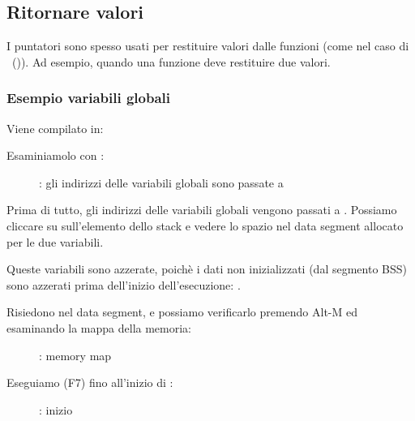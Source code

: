 \subsection{Ritornare valori}

I puntatori sono spesso usati per restituire valori dalle funzioni (come nel caso di \scanf ~()).
Ad esempio, quando una funzione deve restituire due valori.

\subsubsection{Esempio variabili globali}



Viene compilato in:



\myindex{\olly}
\clearpage
Esaminiamolo con \olly:

\begin{figure}[H]
\centering
{}
\caption{\olly:
gli indirizzi delle variabili globali sono passate a \ttfone}
\label{fig:pointers_olly_global_1}
\end{figure}

Prima di tutto, gli indirizzi delle variabili globali vengono passati a \ttfone.
Possiamo cliccare su  sull'elemento dello stack e vedere lo spazio nel data segment allocato per le due variabili.

\clearpage
Queste variabili sono azzerate, poichè i dati non inizializzati (dal segmento \ac{BSS}) sono azzerati prima dell'inizio dell'esecuzione: .

Risiedono nel data segment, e possiamo verificarlo premendo Alt-M ed esaminando la mappa della memoria:

\begin{figure}[H]
\centering
{}
\caption{\olly: memory map}
\label{fig:pointers_olly_global_5}
\end{figure}

\clearpage
Eseguiamo (F7) fino all'inizio di \ttfone: 

\begin{figure}[H]
\centering
{}
\caption{\olly: \ttfone inizio}
\label{fig:pointers_olly_global_2}
\end{figure}

